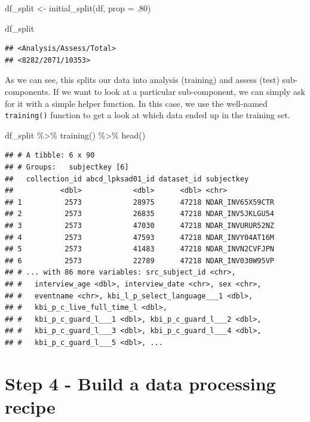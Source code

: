 \documentclass[
]{book}
\newenvironment{Shaded}{\begin{snugshade}}{\end{snugshade}}
\newcommand{\AttributeTok}[1]{\textcolor[rgb]{0.77,0.63,0.00}{#1}}
\newcommand{\DecValTok}[1]{\textcolor[rgb]{0.00,0.00,0.81}{#1}}
\newcommand{\FunctionTok}[1]{\textcolor[rgb]{0.00,0.00,0.00}{#1}}
\newcommand{\NormalTok}[1]{#1}
\newcommand{\OtherTok}[1]{\textcolor[rgb]{0.56,0.35,0.01}{#1}}
\newcommand{\SpecialCharTok}[1]{\textcolor[rgb]{0.00,0.00,0.00}{#1}}
\begin{document}
\begin{Shaded}
\begin{Highlighting}[]
\NormalTok{df\_split }\OtherTok{\textless{}{-}} \FunctionTok{initial\_split}\NormalTok{(df, }\AttributeTok{prop =}\NormalTok{ .}\DecValTok{80}\NormalTok{)}

\NormalTok{df\_split}
\end{Highlighting}
\end{Shaded}

\begin{verbatim}
## <Analysis/Assess/Total>
## <8282/2071/10353>
\end{verbatim}

As we can see, this splits our data into analysis (training) and assess (test) sub-components. If we want to look at a particular sub-component, we can simply ask for it with a simple helper function. In this case, we use the well-named \texttt{training()} function to get a look at which data ended up in the training set.

\begin{Shaded}
\begin{Highlighting}[]
\NormalTok{df\_split }\SpecialCharTok{\%\textgreater{}\%}
  \FunctionTok{training}\NormalTok{() }\SpecialCharTok{\%\textgreater{}\%} 
  \FunctionTok{head}\NormalTok{()}
\end{Highlighting}
\end{Shaded}

\begin{verbatim}
## # A tibble: 6 x 90
## # Groups:   subjectkey [6]
##   collection_id abcd_lpksad01_id dataset_id subjectkey      
##           <dbl>            <dbl>      <dbl> <chr>           
## 1          2573            28975      47218 NDAR_INV65X59CTR
## 2          2573            26835      47218 NDAR_INV5JKLGU54
## 3          2573            47030      47218 NDAR_INVURUR52NZ
## 4          2573            47593      47218 NDAR_INVY04AT16M
## 5          2573            41483      47218 NDAR_INVN2CVFJPN
## 6          2573            22789      47218 NDAR_INV030W95VP
## # ... with 86 more variables: src_subject_id <chr>,
## #   interview_age <dbl>, interview_date <chr>, sex <chr>,
## #   eventname <chr>, kbi_l_p_select_language___1 <dbl>,
## #   kbi_p_c_live_full_time_l <dbl>,
## #   kbi_p_c_guard_l___1 <dbl>, kbi_p_c_guard_l___2 <dbl>,
## #   kbi_p_c_guard_l___3 <dbl>, kbi_p_c_guard_l___4 <dbl>,
## #   kbi_p_c_guard_l___5 <dbl>, ...
\end{verbatim}

\hypertarget{step-4---build-a-data-processing-recipe}{%
\section{Step 4 - Build a data processing recipe}\label{step-4---build-a-data-processing-recipe}}
\end{document}
